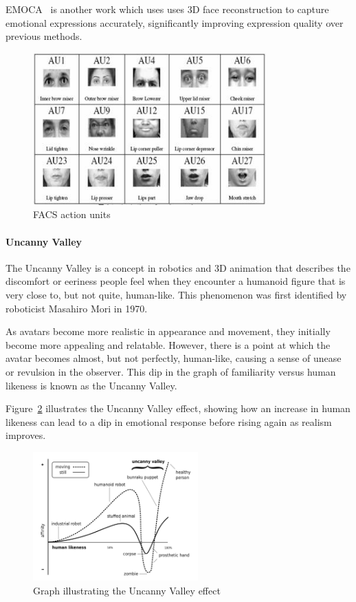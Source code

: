 \documentclass[../../main.tex]{subfiles}
\begin{document}
EMOCA~\cite{danvevcek2022emoca} is another work which uses uses 3D face reconstruction to capture emotional expressions accurately, significantly improving expression quality over previous methods.

\begin{figure}
    \centering
    \includegraphics[width=0.8\textwidth]{chapters/background_work/images/action_units.jpg}
    \caption{FACS action units}
    \label{fig:action_units}
\end{figure}

\paragraph{Uncanny Valley}
\label{ch:background_work:sign_language_synthesis:3d_techniques:avatar_animation:uncanny_valley}

The Uncanny Valley is a concept in robotics and 3D animation that describes the discomfort or eeriness people feel when they encounter a humanoid figure that is very close to, but not quite, human-like. This phenomenon was first identified by roboticist Masahiro Mori in 1970.

As avatars become more realistic in appearance and movement, they initially become more appealing and relatable. However, there is a point at which the avatar becomes almost, but not perfectly, human-like, causing a sense of unease or revulsion in the observer. This dip in the graph of familiarity versus human likeness is known as the Uncanny Valley.

Figure~\ref{fig:uncanny_valley_graph} illustrates the Uncanny Valley effect, showing how an increase in human likeness can lead to a dip in emotional response before rising again as realism improves.

\begin{figure}
  \centering
  \includegraphics[width = 2.5in]{chapters/background_work/images/uncanny_valley_graph.png}
  \caption{Graph illustrating the Uncanny Valley effect}
  \label{fig:uncanny_valley_graph}
\end{figure}
\end{document}
